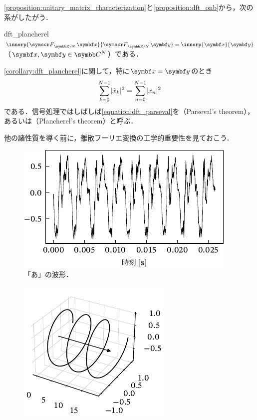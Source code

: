 \documentclass[../../main]{subfiles}
\begin{document}
\cref{proposition:unitary_matrix_characterization}と\cref{proposition:dft_onb}から，次の系がしたがう．

\begin{corollary}{}{dft_plancherel}
  \(\innerp{\dft{N}\vect{x}}{\dft{N}\vect{y}}=\innerp{\vect{x}}{\vect{y}}\)（\(\vect{x},\vect{y}\in\numset{C}^N\)）である．
\end{corollary}

\cref{corollary:dft_plancherel}に関して，特に\(\vect{x}=\vect{y}\)のとき
\begin{equation}
  \label{equation:dft_parseval}
  \sum_{k=0}^{N-1}\lvert\hat{x}_k\rvert^2 = \sum_{n=0}^{N-1}\lvert x_n\rvert^2
\end{equation}
である．信号処理ではしばしば\cref{equation:dft_parseval}を（Parseval's theorem），あるいは（Plancherel's theorem）と呼ぶ．

他の諸性質を導く前に，離散フーリエ変換の工学的重要性を見ておこう．

\begin{figure}[htbp]
  \centering
  \includegraphics{figures/time_domain.pdf}
  \caption{「あ」の波形．}
  \label{figure:time_domain}
\end{figure}

\pagebreak

\begin{figure}
  \includegraphics{figures/helix.pdf}
\end{figure}
\end{document}
